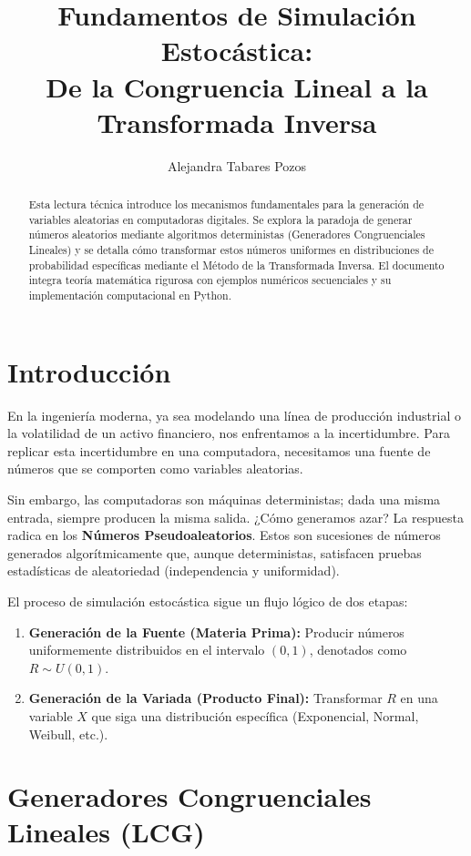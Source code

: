 \documentclass[11pt, letterpaper]{article}
\title{Fundamentos de Simulación Estocástica: \\ De la Congruencia Lineal a la Transformada Inversa}
\author{Alejandra Tabares Pozos}
\date{}
\begin{document}
\maketitle
\tableofcontents
\newpage

\begin{abstract}
\noindent Esta lectura técnica introduce los mecanismos fundamentales para la generación de variables aleatorias en computadoras digitales. Se explora la paradoja de generar números aleatorios mediante algoritmos deterministas (Generadores Congruenciales Lineales) y se detalla cómo transformar estos números uniformes en distribuciones de probabilidad específicas mediante el Método de la Transformada Inversa. El documento integra teoría matemática rigurosa con ejemplos numéricos secuenciales y su implementación computacional en Python.
\end{abstract}

\section{Introducción}

En la ingeniería moderna, ya sea modelando una línea de producción industrial o la volatilidad de un activo financiero, nos enfrentamos a la incertidumbre. Para replicar esta incertidumbre en una computadora, necesitamos una fuente de números que se comporten como variables aleatorias.

Sin embargo, las computadoras son máquinas deterministas; dada una misma entrada, siempre producen la misma salida. ¿Cómo generamos azar? La respuesta radica en los \textbf{Números Pseudoaleatorios}. Estos son sucesiones de números generados algorítmicamente que, aunque deterministas, satisfacen pruebas estadísticas de aleatoriedad (independencia y uniformidad).

El proceso de simulación estocástica sigue un flujo lógico de dos etapas:
\begin{enumerate}
    \item \textbf{Generación de la Fuente (Materia Prima):} Producir números uniformemente distribuidos en el intervalo $(0,1)$, denotados como $R \sim U(0,1)$.
    \item \textbf{Generación de la Variada (Producto Final):} Transformar $R$ en una variable $X$ que siga una distribución específica (Exponencial, Normal, Weibull, etc.).
\end{enumerate}

\section{Generadores Congruenciales Lineales (LCG)}
\end{document}
